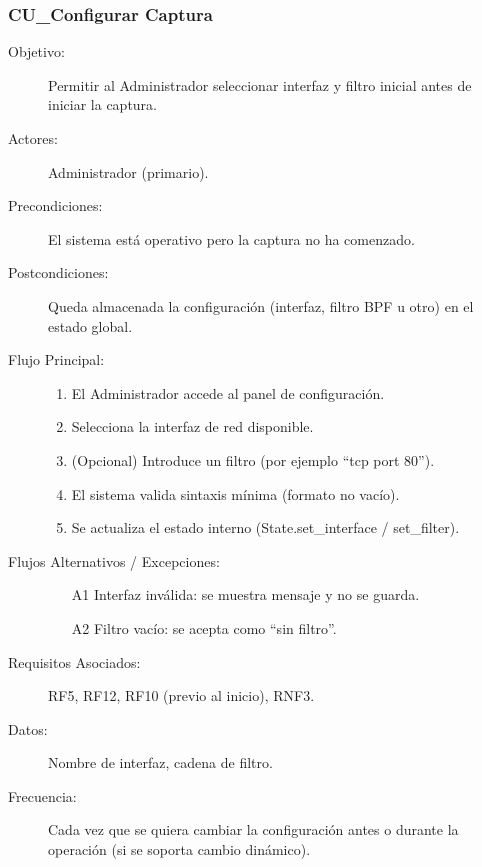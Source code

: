 \subsubsection{CU\_Configurar Captura}
\begin{description}
  \item[Objetivo:] Permitir al Administrador seleccionar interfaz y filtro inicial antes de iniciar la captura.
  \item[Actores:] Administrador (primario).
  \item[Precondiciones:] El sistema está operativo pero la captura no ha comenzado.
  \item[Postcondiciones:] Queda almacenada la configuración (interfaz, filtro BPF u otro) en el estado global.
  \item[Flujo Principal:]
    \begin{enumerate}
      \item El Administrador accede al panel de configuración.
      \item Selecciona la interfaz de red disponible.
      \item (Opcional) Introduce un filtro (por ejemplo ``tcp port 80'').
      \item El sistema valida sintaxis mínima (formato no vacío).
      \item Se actualiza el estado interno (State.set\_interface / set\_filter).
    \end{enumerate}
  \item[Flujos Alternativos / Excepciones:]
    \begin{enumerate}
      \item[A1] Interfaz inválida: se muestra mensaje y no se guarda.
      \item[A2] Filtro vacío: se acepta como “sin filtro”.
    \end{enumerate}
  \item[Requisitos Asociados:] RF5, RF12, RF10 (previo al inicio), RNF3.
  \item[Datos:] Nombre de interfaz, cadena de filtro.
  \item[Frecuencia:] Cada vez que se quiera cambiar la configuración antes o durante la operación (si se soporta cambio dinámico).
\end{description}

